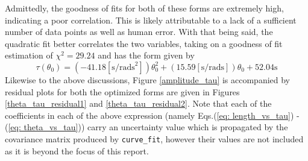 Admittedly, the goodness of fits for both of these forms are extremely high, indicating a poor correlation. This is likely attributable to a lack of a sufficient number of data points as well as human error. With that being said, the quadratic fit better correlates the two variables, taking on a goodness of fit estimation of $\chi^2 = 29.24$ and has the form given by
\begin{equation} \label{eq: theta_vs_tau}
    \tau(\theta_0) = \left(-41.18[\text{s}/\text{rads}^2]\right)\theta_0^2 + \left(15.59[\text{s}/\text{rads}]\right)\theta_0 + 52.04\text{s}
\end{equation}
Likewise to the above discussions, Figure \ref{amplitude_tau} is accompanied by residual plots for both the optimized forms are given in Figures \ref{theta_tau_residual1} and \ref{theta_tau_residual2}. Note that each of the coefficients in each of the above expression (namely Eqs.(\ref{eq: length_vs_tau}) - (\ref{eq: theta_vs_tau})) carry an uncertainty value which is propagated by the covariance matrix produced by \texttt{curve\_fit}, however their values are not included as it is beyond the focus of this report.\\[0.20cm]
